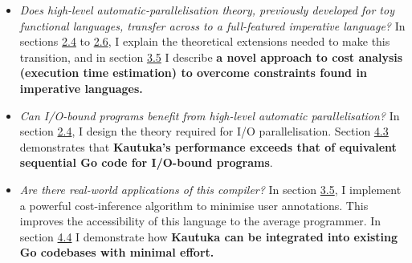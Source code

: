 \begin{itemize}
  \item \textit{Does high-level automatic-parallelisation theory, previously developed for toy functional languages, transfer across to a full-featured imperative language?} In sections \hyperref[sec:2.4]{2.4} to \hyperref[sec:2.6]{2.6}, I explain the theoretical extensions needed to make this transition, and in section \hyperref[sec:3.5]{3.5} I describe \textbf{a novel approach to cost analysis (execution time estimation) to overcome constraints found in imperative languages.}
  \item \textit{Can I/O-bound programs benefit from high-level automatic parallelisation?} In section \hyperref[sec:2.4]{2.4}, I design the theory required for I/O parallelisation. Section \hyperref[sec:4.3]{4.3} demonstrates that \textbf{Kautuka's performance exceeds that of equivalent sequential Go code for I/O-bound programs}. 
  \item \textit{Are there real-world applications of this compiler?} In section \hyperref[sec:3.5]{3.5}, I implement a powerful cost-inference algorithm to minimise user annotations. This improves the accessibility of this language to the average programmer. In section \hyperref[sec:4.4]{4.4} I demonstrate how \textbf{Kautuka can be integrated into existing Go codebases with minimal effort.}
\end{itemize}
